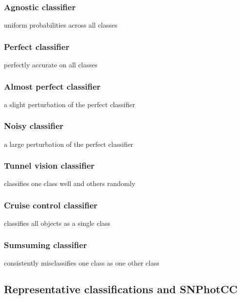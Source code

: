 \subsubsection{Agnostic classifier}
\label{sec:agnostic_data}

uniform probabilities across all classes

\subsubsection{Perfect classifier}
\label{sec:perfect_data}

perfectly accurate on all classes

\subsubsection{Almost perfect classifier}
\label{sec:almost_data}

a slight perturbation of the perfect classifier

\subsubsection{Noisy classifier}
\label{sec:nois_datay}

a large perturbation of the perfect classifier

\subsubsection{Tunnel vision classifier}
\label{sec:tunnel_data}

classifies one class well and others randomly

\subsubsection{Cruise control classifier}
\label{sec:cruise_data}

classifies all objects as a single class

\subsubsection{Sumsuming classifier}
\label{sec:subsume_data}

consistently misclassifies one class as one other class

\subsection{Representative classifications and SNPhotCC}
\label{sec:realdata}

